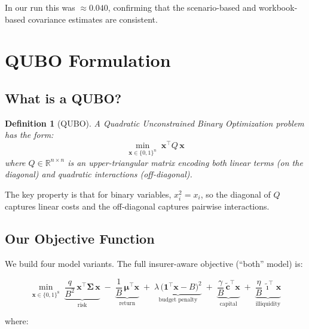 \documentclass[12pt, a4paper]{article}
\newtheorem{definition}{Definition}[section]
\begin{document}
In our run this was $\approx 0.040$, confirming that the scenario-based and
workbook-based covariance estimates are consistent.


\section{QUBO Formulation}

\subsection{What is a QUBO?}

\begin{definition}[QUBO]
A Quadratic Unconstrained Binary Optimization problem has the form:
\[
\min_{\mathbf{x} \in \{0,1\}^n} \; \mathbf{x}^\top Q\, \mathbf{x}
\]
where $Q \in \mathbb{R}^{n \times n}$ is an upper-triangular matrix encoding
both linear terms (on the diagonal) and quadratic interactions (off-diagonal).
\end{definition}

The key property is that for binary variables, $x_i^2 = x_i$, so the diagonal
of $Q$ captures linear costs and the off-diagonal captures pairwise interactions.

\subsection{Our Objective Function}

We build four model variants. The full insurer-aware objective (``both'' model) is:

\begin{equation}
\boxed{
\min_{\mathbf{x} \in \{0,1\}^8} \;
\underbrace{\frac{q}{B^2}\, \mathbf{x}^\top \bm{\Sigma}\, \mathbf{x}}_{\text{risk}}
\;-\; \underbrace{\frac{1}{B}\, \bm{\mu}^\top \mathbf{x}}_{\text{return}}
\;+\; \underbrace{\lambda\, \bigl(\mathbf{1}^\top \mathbf{x} - B\bigr)^2}_{\text{budget penalty}}
\;+\; \underbrace{\frac{\gamma}{B}\, \tilde{\mathbf{c}}^\top \mathbf{x}}_{\text{capital}}
\;+\; \underbrace{\frac{\eta}{B}\, \tilde{\bm{\imath}}^\top \mathbf{x}}_{\text{illiquidity}}
}
\label{eq:full_objective}
\end{equation}

where:
\end{document}
